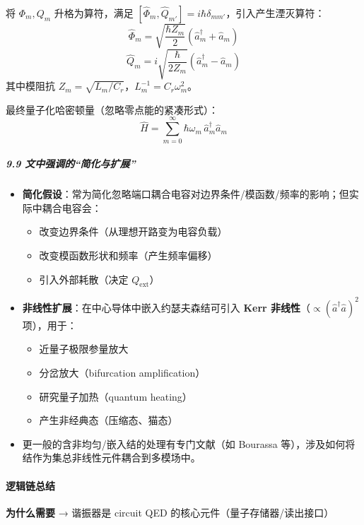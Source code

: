 \documentclass[12pt,a4paper,oneside]{ctexbook}
\providecommand{\tightlist}{%
  \setlength{\itemsep}{0pt}\setlength{\parskip}{0pt}}
\let\oldparagraph\paragraph
\renewcommand{\paragraph}[1]{\oldparagraph{#1}\mbox{}}
\let\oldsubparagraph\subparagraph
\renewcommand{\subparagraph}[1]{\oldsubparagraph{#1}\mbox{}}
\begin{document}
将 \(\Phi_m,Q_m\) 升格为算符，满足
\([\hat{\Phi}_m,\hat{Q}_{m'}]=i\hbar\delta_{mm'}\)，引入产生湮灭算符：
\[\hat{\Phi}_m=\sqrt{\frac{\hbar Z_m}{2}}(\hat a_m^\dagger+\hat a_m)\]
\[\hat{Q}_m=i\sqrt{\frac{\hbar}{2Z_m}}(\hat a_m^\dagger-\hat a_m)\]
其中模阻抗 \(Z_m=\sqrt{L_m/C_r}\)，\(L_m^{-1}=C_r\omega_m^2\)。

最终量子化哈密顿量（忽略零点能的紧凑形式）：
\[\hat H=\sum_{m=0}^{\infty}\hbar\omega_m\,\hat a_m^\dagger\hat a_m\]

\subparagraph{9.9
文中强调的``简化与扩展''}\label{ux6587ux4e2dux5f3aux8c03ux7684ux7b80ux5316ux4e0eux6269ux5c55}

\begin{itemize}
\tightlist
\item
  \textbf{简化假设}：常为简化忽略端口耦合电容对边界条件/模函数/频率的影响；但实际中耦合电容会：

  \begin{itemize}
  \tightlist
  \item
    改变边界条件（从理想开路变为电容负载）
  \item
    改变模函数形状和频率（产生频率偏移）
  \item
    引入外部耗散（决定 \(Q_{\text{ext}}\)）
  \end{itemize}
\item
  \textbf{非线性扩展}：在中心导体中嵌入约瑟夫森结可引入 \textbf{Kerr
  非线性}（\(\propto (\hat a^\dagger\hat a)^2\) 项），用于：

  \begin{itemize}
  \tightlist
  \item
    近量子极限参量放大
  \item
    分岔放大（bifurcation amplification）
  \item
    研究量子加热（quantum heating）
  \item
    产生非经典态（压缩态、猫态）
  \end{itemize}
\item
  更一般的含非均匀/嵌入结的处理有专门文献（如 Bourassa
  等），涉及如何将结作为集总非线性元件耦合到多模场中。
\end{itemize}


\paragraph{逻辑链总结}\label{ux903bux8f91ux94feux603bux7ed3}

\textbf{为什么需要} → 谐振器是 circuit QED
的核心元件（量子存储器/读出接口）
\end{document}
